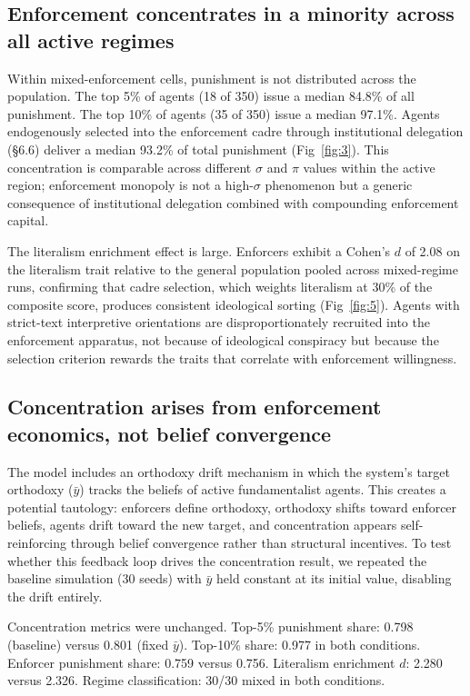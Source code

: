 \documentclass[12pt]{article}
\begin{document}
\subsection{Enforcement concentrates in a minority across all active regimes}

Within mixed-enforcement cells, punishment is not distributed across the population. The top 5\% of agents (18 of 350) issue a median 84.8\% of all punishment. The top 10\% of agents (35 of 350) issue a median 97.1\%. Agents endogenously selected into the enforcement cadre through institutional delegation (\S6.6) deliver a median 93.2\% of total punishment (Fig~\ref{fig:3}). This concentration is comparable across different $\sigma$ and $\pi$ values within the active region; enforcement monopoly is not a high-$\sigma$ phenomenon but a generic consequence of institutional delegation combined with compounding enforcement capital.

The literalism enrichment effect is large. Enforcers exhibit a Cohen's $d$ of 2.08 on the literalism trait relative to the general population pooled across mixed-regime runs, confirming that cadre selection, which weights literalism at 30\% of the composite score, produces consistent ideological sorting (Fig~\ref{fig:5}). Agents with strict-text interpretive orientations are disproportionately recruited into the enforcement apparatus, not because of ideological conspiracy but because the selection criterion rewards the traits that correlate with enforcement willingness.

\subsection{Concentration arises from enforcement economics, not belief convergence}

The model includes an orthodoxy drift mechanism in which the system's target orthodoxy ($\bar{y}$) tracks the beliefs of active fundamentalist agents. This creates a potential tautology: enforcers define orthodoxy, orthodoxy shifts toward enforcer beliefs, agents drift toward the new target, and concentration appears self-reinforcing through belief convergence rather than structural incentives. To test whether this feedback loop drives the concentration result, we repeated the baseline simulation (30 seeds) with $\bar{y}$ held constant at its initial value, disabling the drift entirely.

Concentration metrics were unchanged. Top-5\% punishment share: 0.798 (baseline) versus 0.801 (fixed $\bar{y}$). Top-10\% share: 0.977 in both conditions. Enforcer punishment share: 0.759 versus 0.756. Literalism enrichment $d$: 2.280 versus 2.326. Regime classification: 30/30 mixed in both conditions.
\end{document}
